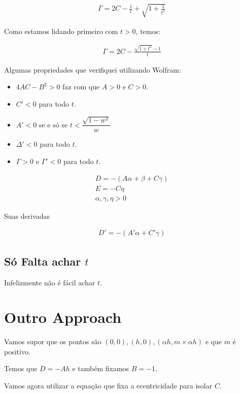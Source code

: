\documentclass{article}
\begin{document}
	\begin{align*}
	\Gamma = 2C - \frac{1}{t} + \sqrt{1 + \frac{1}{t^2}}
	\end{align*}
	
	Como estamos lidando primeiro com $t>0$, temos:
	
	\begin{align*}
	\Gamma = 2C - \frac{\sqrt{1+t^2} - 1}{t}
	\end{align*}
	
	Algumas propriedades que verifiquei utilizando Wolfram:
	
	\begin{itemize}
		\item $4AC - B^2>0$ faz com que $A>0$ e $C>0$.
		\item $C'<0$ para todo $t$.
		\item $A'<0$ se e só se $t < \dfrac{\sqrt{1-w^2}}{w}$
		\item $\Delta' < 0$ para todo $t$.
		\item $\Gamma>0$ e $\Gamma' < 0$ para todo $t$.
	\end{itemize}

	
	\begin{align*}
	D = -(A\alpha + \beta + C\gamma)\\
	E = -C\eta\\
	\alpha, \gamma, \eta>0
	\end{align*}
	
	Suas derivadas
	
	\begin{align*}
	D' = -(A'\alpha + C'\gamma)
	\end{align*}
	
	\subsection{Só Falta achar $t$}
	
	Infelizmente não é fácil achar $t$.
	
	\section{Outro Approach}
	
	Vamos supor que os pontos são $(0,0), (h, 0), (\alpha h, m \times \alpha h)$ e que $m$ é positivo.
	
	Temos que $D = -Ah$ e também fixamos $B=-1$.
	
	Vamos agora utilizar a equação que fixa a ecentricidade para isolar $C$.
	
\end{document}
